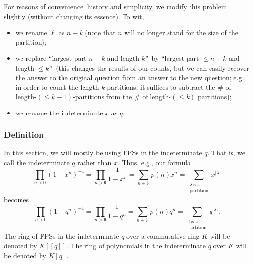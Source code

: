 For reasons of convenience, history and simplicity, we modify this problem
slightly (without changing its essence). To wit,

\begin{itemize}
\item we rename $\ell$ as $n-k$ (note that $n$ will no longer stand for the
size of the partition);

\item we replace \textquotedblleft largest part $n-k$ and length
$k$\textquotedblright\ by \textquotedblleft largest part $\leq n-k$ and length
$\leq k$\textquotedblright\ (this changes the results of our counts, but we
can easily recover the answer to the original question from an answer to the
new question; e.g., in order to count the length-$k$ partitions, it suffices
to subtract the \# of length-$\left(  \leq k-1\right)  $-partitions from the
\# of length-$\left(  \leq k\right)  $ partitions);

\item we rename the indeterminate $x$ as $q$.
\end{itemize}

\subsubsection{Definition}

\begin{convention}
\label{conv.pars.qbinom.q}In this section, we will mostly be using FPSs in the
indeterminate $q$. That is, we call the indeterminate $q$ rather than $x$.
Thus, e.g., our formula%
\[
\prod_{n>0}\left(  1-x^{n}\right)  ^{-1}=\prod_{n>0}\dfrac{1}{1-x^{n}}%
=\sum_{n\in\mathbb{N}}p\left(  n\right)  x^{n}=\sum_{\substack{\lambda\text{
is a}\\\text{partition}}}x^{\left\vert \lambda\right\vert }%
\]
becomes%
\[
\prod_{n>0}\left(  1-q^{n}\right)  ^{-1}=\prod_{n>0}\dfrac{1}{1-q^{n}}%
=\sum_{n\in\mathbb{N}}p\left(  n\right)  q^{n}=\sum_{\substack{\lambda\text{
is a}\\\text{partition}}}q^{\left\vert \lambda\right\vert }.
\]
The ring of FPSs in the indeterminate $q$ over a commutative ring $K$ will be
denoted by $K\left[  \left[  q\right]  \right]  $. The ring of polynomials in
the indeterminate $q$ over $K$ will be denoted by $K\left[  q\right]  $.
\end{convention}

